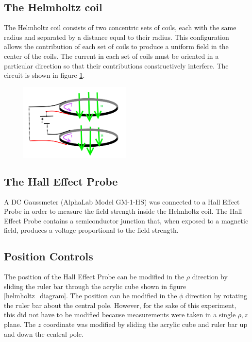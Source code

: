 \documentclass[a4paper]{article}
\begin{document}
\subsection{The Helmholtz coil}

\qq The Helmholtz coil consists of two concentric sets of coils, each with the same
radius and separated by a distance equal to their radius. This configuration
allows the contribution of each set of coils to produce a uniform field in the
center of the coils. The current in each set of coils must be oriented in a
particular direction so that their contributions constructively interfere. The
circuit is shown in figure \ref{helmholtz_circuit}.

\begin{figure}[H]
\centering
\includegraphics[width=0.5\textwidth]{circuit.png}

\label{helmholtz_circuit}
\end{figure}

\subsection{The Hall Effect Probe}

\qq A DC Gaussmeter (AlphaLab Model GM-1-HS) was connected to a Hall Effect Probe in
order to measure the field strength inside the Helmholtz coil. The Hall Effect
Probe contains a semiconductor junction that, when exposed to a magnetic field,
produces a voltage proportional to the field strength.

\subsection{Position Controls}

\qq The position of the Hall Effect Probe can be modified in the $\rho$ direction by
sliding the ruler bar through the acrylic cube shown in figure
\ref{helmholtz_diagram}. The position can be modified in the $\phi$ direction by
rotating the ruler bar about the central pole. However, for the sake of this
experiment, this did not have to be modified because measurements were taken in
a single $\rho , z$ plane. The $z$ coordinate was modified by sliding the
acrylic cube and ruler bar up and down the central pole.
\end{document}
